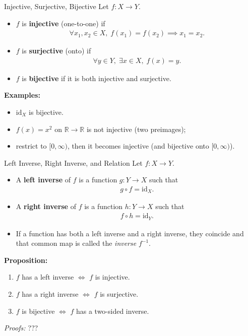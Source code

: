 \documentclass[11pt,aspectratio=43,ignorenonframetext,t]{beamer}
\begin{document}
\begin{frame}{Injective, Surjective, Bijective}
Let \(f: X \to Y\).

\begin{itemize}
  \item \(f\) is \textbf{injective} (one-to-one) if
  \begin{align*}
    \forall x_1, x_2 \in X,\; f(x_1) = f(x_2) \implies x_1 = x_2.
  \end{align*}
  \item \(f\) is \textbf{surjective} (onto) if
  \begin{align*}
    \forall y \in Y,\; \exists x \in X,\; f(x) = y.
  \end{align*}
  \item \(f\) is \textbf{bijective} if it is both injective and surjective.
\end{itemize}

\textbf{Examples:}  
\begin{itemize}
    \item \(\mathrm{id}_X\) is bijective.
    \item \(f(x) = x^2\) on \(\mathbb{R} \to \mathbb{R}\) is not injective (two preimages);
    \item restrict to \([0,\infty)\), then it becomes injective (and bijective onto \([0,\infty)\)).
\end{itemize}
\end{frame}

\begin{frame}{Left Inverse, Right Inverse, and Relation}
Let \(f: X \to Y\).

\begin{itemize}
  \item A \textbf{left inverse} of \(f\) is a function \(g: Y \to X\) such that
  \begin{align*}
    g \circ f = \mathrm{id}_X.
  \end{align*}
  \item A \textbf{right inverse} of \(f\) is a function \(h: Y \to X\) such that
  \begin{align*}
    f \circ h = \mathrm{id}_Y.
  \end{align*}
  \item If a function has both a left inverse and a right inverse, they coincide and that common map is called the \emph{inverse} \(f^{-1}\).
\end{itemize}


\textbf{Proposition:}
\begin{enumerate}
  \item \(f\) has a left inverse \(\iff\) \(f\) is injective.
  \item \(f\) has a right inverse \(\iff\) \(f\) is surjective.
  \item \(f\) is bijective \(\iff\) \(f\) has a two-sided inverse.
\end{enumerate}

\emph{Proofs:} ???
\end{frame}
\end{document}
